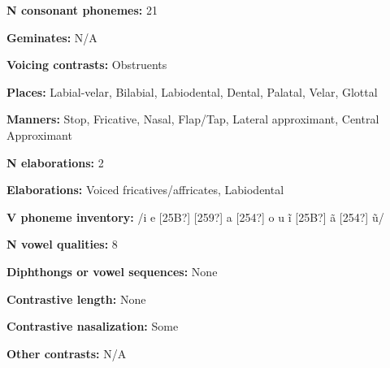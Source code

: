 \begin{styleBody}
\textbf{N consonant phonemes:} 21
\end{styleBody}

\begin{styleBody}
\textbf{Geminates:} N/A
\end{styleBody}

\begin{styleBody}
\textbf{Voicing contrasts:} Obstruents
\end{styleBody}

\begin{styleBody}
\textbf{Places:} Labial-velar, Bilabial, Labiodental, Dental, Palatal, Velar, Glottal
\end{styleBody}

\begin{styleBody}
\textbf{Manners:} Stop, Fricative, Nasal, Flap/Tap, Lateral approximant, Central Approximant
\end{styleBody}

\begin{styleBody}
\textbf{N elaborations:} 2
\end{styleBody}

\begin{styleBody}
\textbf{Elaborations:} Voiced fricatives/affricates, Labiodental
\end{styleBody}

\begin{styleBody}
\textbf{V phoneme inventory:} /i e [25B?] [259?] a [254?] o u \~{i} [25B?] \~{a} [254?] \~{u}/
\end{styleBody}

\begin{styleBody}
\textbf{N vowel qualities:} 8
\end{styleBody}

\begin{styleBody}
\textbf{Diphthongs or vowel sequences:} None
\end{styleBody}

\begin{styleBody}
\textbf{Contrastive length:} None
\end{styleBody}

\begin{styleBody}
\textbf{Contrastive nasalization:} Some
\end{styleBody}

\begin{styleBody}
\textbf{Other contrasts: }N/A
\end{styleBody}

